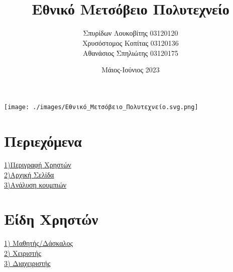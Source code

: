 \documentclass[14pt]{report}
\title{\textbf{ \fontsize{28}{30}{\textlatin{User manual of semester project of Databases}} \\ Εθνικό Μετσόβειο Πολυτεχνείο }}
\author{Σπυρίδων Λουκοβίτης 03120120 \\ Χρυσόστομος Κοπίτας 03120136
	\\ Αθανάσιος Σπηλιώτης 03120175}
\date{Μάιος-Ιούνιος 2023}
\makeatletter
\renewcommand{\maketitle}{
	\begin{center}
		\texttt{[image: ./images/Εθνικό\_Μετσόβειο\_Πολυτεχνείο.svg.png]} %
		\par\vspace{2cm} %
		{\LARGE\@title\par}
		\vspace{1.5cm} %
		{\large\@date\par}
		\vspace{1.5cm} %
		{\large\@author\par}
	\end{center}
}
\makeatother
\begin{document}
	\maketitle
	\hypersetup{linkcolor=teal}
	
	
	\chapter*{\Large Περιεχόμενα}
	\hyperlink{Users}{\Large 1)Περιγραφή Χρηστών} \\
	\hyperlink{Homepage}{\Large 2)Αρχική Σελίδα} \\
	\hyperlink{Buttons}{\Large 3)Ανάλυση κουμπιών} \\
	
	\newpage
	\hypertarget{Users}{}
	\chapter*{\Large Είδη Χρηστών}
	\vspace{\baselineskip}
	
	\hyperlink{studentanchor}{\Large 1) Μαθητής/Δάσκαλος} \\
	\hyperlink{operatoranchor}{\Large 2) Χειριστής} \\
	\hyperlink{adminanchor}{\Large 3) Διαχειριστής} \\
	
\end{document}
